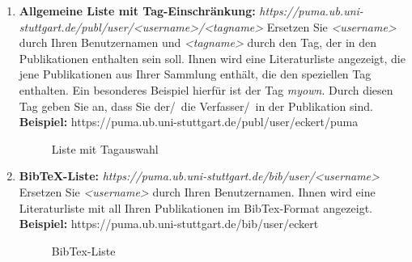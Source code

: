 \begin{enumerate}
    \item \textbf{Allgemeine Liste mit Tag-Einschränkung:}\newline
    \textit{https://puma.ub.uni-stuttgart.de/publ/user/<username>/<tagname>}\newline
    Ersetzen Sie \textit{<username>} durch Ihren Benutzernamen und \textit{<tagname>} durch den Tag, der in den Publikationen enthalten sein soll. Ihnen wird eine Literaturliste angezeigt, die jene Publikationen aus Ihrer Sammlung enthält, die den speziellen Tag enthalten. Ein besonderes Beispiel hierfür ist der Tag \textit{myown}. Durch diesen Tag geben Sie an, dass Sie der/~die Verfasser/~in der Publikation sind. \newline
    \textbf{Beispiel:} https://puma.ub.uni-stuttgart.de/publ/user/eckert/puma
   
\begin{figure}[h!]
 \centering
 \caption{Liste mit Tagauswahl}
 \label{figure037}
\end{figure}

    \item \textbf{BibTeX-Liste:}\newline
    \textit{https://puma.ub.uni-stuttgart.de/bib/user/<username>} \newline
    Ersetzen Sie \textit{<username>} durch Ihren Benutzernamen. Ihnen wird eine Literaturliste mit all Ihren Publikationen im BibTex-Format angezeigt.\newline
    \textbf{Beispiel:} https://puma.ub.uni-stuttgart.de/bib/user/eckert 

\begin{figure}[h!]
 \centering
 \caption{BibTex-Liste}
 \label{figure038}
\end{figure}

\end{enumerate}
